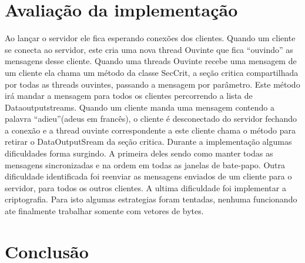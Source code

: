 \documentclass[a4paper,12pt]{article}
\begin{document}
\section{Avaliação da implementação}
Ao lançar o servidor ele fica esperando conexões dos clientes. Quando um cliente se conecta ao servidor, este cria uma nova thread Ouvinte que fica “ouvindo” as mensagens desse cliente. 
Quando uma threads Ouvinte recebe uma mensagem de um cliente ela chama um método da classe SecCrit, a seção critica compartilhada por todas as threads ouvintes, passando a mensagem por parâmetro. Este método irá mandar a mensagem para todos os clientes percorrendo a lista de Dataoutputstreams.
Quando um cliente manda uma mensagem contendo a palavra “adieu”(adeus em francês), o cliente é desconectado do servidor fechando a conexão e a thread ouvinte correspondente a este cliente chama o método para retirar o DataOutputSream da seção critica.
Durante a implementação algumas dificuldades forma surgindo. A primeira deles sendo como manter todas as mensagens sincronizadas e na ordem em todas as janelas de bate-papo.
Outra dificuldade identificada foi reenviar as mensagens enviados de um cliente para o servidor, para todos os outros clientes.
A ultima dificuldade foi implementar a criptografia. Para isto algumas estrategias foram tentadas, nenhuma funcionando ate finalmente trabalhar somente com vetores de bytes.
\section{Conclusão}





\end{document}
